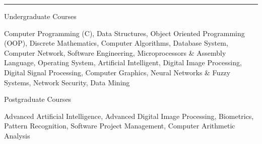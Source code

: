 \documentclass[a4paper,10pt]{article}
\newlength{\cvcolumngapwidth}
\newlength{\cvleftcolumnwidth}
\newlength{\cvrightcolumnwidth}
\newcommand{\cvsectionstyle}[1]{{\normalsize\cvsectionfont\textcolor{cvsectioncolor}{#1}}}
\newcommand{\cvheadingstyle}[1]{{\normalsize\cvheadingfont\textcolor{cvheadingcolor}{#1}}}
\newlength{\cvafteritemskipamount}
\newlength{\cvaftersectionskipamount}
\newlength{\cvparskip}
\newcommand{\cvsection}[1]{
    \begin{minipage}[t]{\cvleftcolumnwidth}
        \raggedleft\cvsectionstyle{#1}
    \end{minipage}%
    \hspace{\cvcolumngapwidth}%
    \begin{minipage}[t]{\cvrightcolumnwidth}
        \textcolor{cvrulecolor}{\rule{\cvrightcolumnwidth}{0.3mm}}
    \end{minipage}

    \vspace{\cvaftersectionskipamount}
}
\newcommand{\cvitem}[2]{
    \begin{minipage}[t]{\cvleftcolumnwidth}
        \raggedleft #1
    \end{minipage}%
    \hspace{\cvcolumngapwidth}%
    \begin{minipage}[t]{\cvrightcolumnwidth}
        \setlength{\parskip}{\cvparskip} #2
    \end{minipage}

    \vspace{\cvafteritemskipamount}
}
\begin{document}
\cvsection{RELEVANT COURSEWORKS}
\cvitem{
    \cvheadingstyle{Undergraduate Courses}
}{
    Computer Programming (C),
    Data Structures,
    Object Oriented Programming (OOP),
    Discrete Mathematics,
    Computer Algorithms,
    Database System,
    Computer Network,
    Software Engineering,
    Microprocessors \& Assembly Language,
    Operating System,
    Artificial Intelligent,
    Digital Image Processing,
    Digital Signal Processing,
    Computer Graphics,
    Neural Networks \& Fuzzy Systems,
    Network Security, Data Mining
}
\cvitem{
    \cvheadingstyle{Postgraduate Courses}
}{
    Advanced Artificial Intelligence,
    Advanced Digital Image Processing,
    Biometrics,
    Pattern Recognition,
    Software Project Management,
    Computer Arithmetic Analysis\
}
\end{document}
